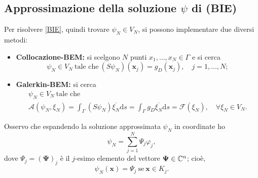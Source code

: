 \subsection{Approssimazione della soluzione $\psi$ di (BIE)}
Per risolvere \eqref{BIE}, quindi trovare $\psi_N \in V_N$, si possono implementare due diversi metodi:
\begin{itemize}
	\item \textbf{Collocazione-BEM:} si scelgono $N$ punti $x_1,\dots,x_N \in \Gamma$ e si cerca
	\begin{equation}
		\psi_N\in V_N \ \text{tale che} \ (S\psi_N)(\textbf{x}_j) = g_D(\textbf{x}_j), \quad j= 1,\dots,N;
	\end{equation}
	\item \textbf{Galerkin-BEM:} si cerca
	\begin{multline} \label{Galerkin}
		\psi_N \in V_N \ \text{tale che} \\ \mathcal{A}(\psi_N,\xi_N) = \int_\Gamma (S\psi_N)\overline{\xi_N} \mathrm{d}s = \int_\Gamma g_D\overline{\xi_N} \mathrm{d}s = \mathcal{F}(\xi_N), \quad \forall \xi_N \in V_N.
	\end{multline}
\end{itemize}
Osservo che espandendo la soluzione approssimata $\psi_N$ in coordinate ho
\[ \psi_N= \sum_{j=1}^N \Psi_j \varphi_j, \]
dove $\Psi_j = (\pmb{\Psi})_j$ è il $j$-esimo elemento del vettore $\bm{\Psi} \in \mathbb{C}^n$; cioè, 
\[ \psi_N(\textbf{x}) = \Psi_j \ \text{se} \ \textbf{x} \in K_j. \]



